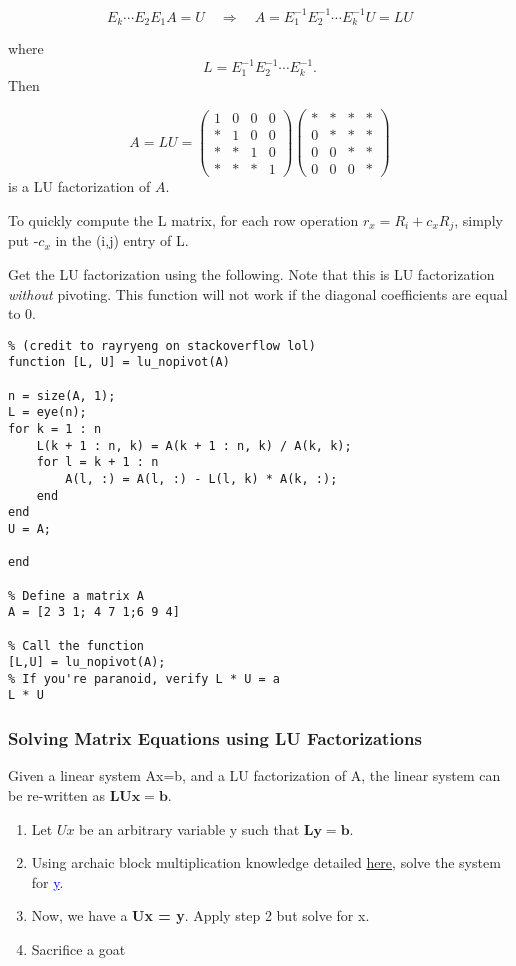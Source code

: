 \documentclass{article}
\newcommand{\bul}[1]{\textcolor{blue}{\underline{#1}}}
\newcommand{\sbreak}{\vspace{10pt}}
\begin{document}
\[
E_k \cdots E_2 E_1 A = U \quad \Rightarrow \quad A = E_1^{-1} E_2^{-1} \cdots E_k^{-1} U = LU
\]

where 
\[
L = E_1^{-1} E_2^{-1} \cdots E_k^{-1}.
\]
Then

\[
A = LU = 
\begin{pmatrix}
1 & 0 & 0 & 0 \\
* & 1 & 0 & 0 \\
* & * & 1 & 0 \\
* & * & * & 1
\end{pmatrix}
\begin{pmatrix}
* & * & * & * \\
0 & * & * & * \\
0 & 0 & * & * \\
0 & 0 & 0 & *
\end{pmatrix}
\]
is a LU factorization of \( A \).

\sbreak

To quickly compute the L matrix, for each row operation $r_x = R_i + c_xR_j$, simply put -$c_x$ in the (i,j) entry of L.

\begin{tcolorbox}[title=MATLAB tip, colback=blue!5, colframe=blue!80!black]
    Get the LU factorization using the following. Note that this is LU factorization \textit{without} pivoting. This function will not work if the diagonal coefficients are equal to 0.
    \begin{lstlisting}
% (credit to rayryeng on stackoverflow lol)
function [L, U] = lu_nopivot(A)

n = size(A, 1);
L = eye(n); 
for k = 1 : n
    L(k + 1 : n, k) = A(k + 1 : n, k) / A(k, k);
    for l = k + 1 : n
        A(l, :) = A(l, :) - L(l, k) * A(k, :);
    end
end
U = A;

end

% Define a matrix A
A = [2 3 1; 4 7 1;6 9 4]

% Call the function
[L,U] = lu_nopivot(A);
% If you're paranoid, verify L * U = a
L * U
    \end{lstlisting}
\end{tcolorbox}
\pagebreak
\subsubsection{Solving Matrix Equations using LU Factorizations}
Given a linear system Ax=b, and a LU factorization of A, the linear system can be re-written as $\mathbf{LUx=b}$.

\begin{enumerate}
    \item Let $Ux$ be an arbitrary variable y such that $\mathbf{Ly = b}$.
    \item Using archaic block multiplication knowledge detailed \hyperref[sec:ubmtsme]{here}, solve the system for \bul{y}.
    \item Now, we have a \textbf{Ux = y}. Apply step 2 but solve for x.
    \item Sacrifice a goat
\end{enumerate}
\end{document}

